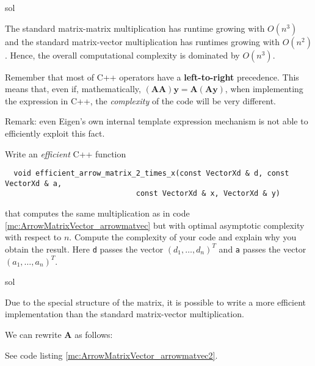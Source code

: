 \begin{samproblem}
\begin{subproblem}{}
 \begin{samwriteprbpart}{sol}
\begin{samsolution}
  The standard matrix-matrix multiplication has runtime growing with $O(n^3)$ and the standard
  matrix-vector multiplication has runtimes growing with $O(n^2)$. Hence, the overall
  computational complexity is dominated by $O(n^3)$.

  Remember that most of C++ operators have a \textbf{left-to-right} precedence. This means that,
  even if,
  mathematically, $(\mathbf{A} \mathbf{A}) \mathbf{y} = \mathbf{A} (\mathbf{A} \mathbf{y})$, when
  implementing the expression in C++, the \emph{complexity} of the code will be very different.

  Remark: even Eigen's own internal template expression mechanism is not able to efficiently
  exploit this fact.
\end{samsolution}
\end{samwriteprbpart}
\end{subproblem}

\begin{subproblem}
Write an \emph{efficient} C++ function
\begin{verbatim}
  void efficient_arrow_matrix_2_times_x(const VectorXd & d, const VectorXd & a,
                              const VectorXd & x, VectorXd & y)
\end{verbatim}
that computes the same multiplication as in code \ref{mc:ArrowMatrixVector_arrowmatvec} but
with optimal asymptotic complexity with respect to {$n$}. Compute the complexity of your code and explain why you obtain the result.
Here \texttt{d} passes the vector $(d_{1},\ldots,d_{n})^{T}$ and \texttt{a} passes the
vector $(a_{1},\ldots,a_{n})^{T}$.
 \begin{samwriteprbpart}{sol}
\begin{samsolution}
  Due to the special structure of the matrix, it is possible to write a more efficient
  implementation than the standard matrix-vector multiplication.

  We can rewrite $\mathbf{A}$ as follows:


  See code listing \ref{mc:ArrowMatrixVector_arrowmatvec2}.
\vspace{0.5cm}

% 
\end{samsolution}
\end{samwriteprbpart}
\end{subproblem}


\end{samproblem}
